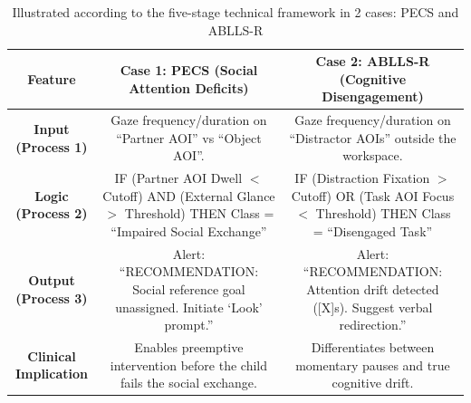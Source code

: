 \begin{table}
    \caption{Illustrated according to the five-stage technical framework in 2 cases: PECS and ABLLS-R}
    \label{tb12}
    \renewcommand{\arraystretch}{3}
    \centering
    \small
    \begin{tabular}{|c|c|c|}
        \hline
        {\parbox{2cm}{\centering\textbf{Feature}}} 
        & {\parbox{5cm}{\textbf{Case 1: PECS (Social Attention Deficits)}}}
        & {\parbox{5cm}{\textbf{Case 2: ABLLS-R (Cognitive Disengagement)}}}
        \\ \hline

        {\parbox{2cm}{\textbf{Input (Process 1)}}}
        & {\parbox{5cm}{Gaze frequency/duration on “Partner AOI” vs “Object AOI”.}}
        & {\parbox{5cm}{Gaze frequency/duration on “Distractor AOIs” outside the workspace.}}
        \\ \hline

        {\parbox{2cm}{\textbf{Logic (Process 2)}}} 
        & {\parbox{5cm}{IF (Partner AOI Dwell $<$ Cutoff) AND (External Glance $>$ Threshold) THEN Class = “Impaired Social Exchange”}}
        & {\parbox{5cm}{IF (Distraction Fixation $>$ Cutoff) OR (Task AOI Focus $<$ Threshold) THEN Class = “Disengaged Task”}}
        \\ \hline

        {\parbox{2cm}{\textbf{Output (Process 3)}}} 
        & {\parbox{5cm}{Alert: “RECOMMENDATION: Social reference goal unassigned. Initiate ‘Look’ prompt.”}}
        & {\parbox{5cm}{Alert: “RECOMMENDATION: Attention drift detected ([X]s). Suggest verbal redirection.”}}
        \\ \hline

        {\parbox{2cm}{\textbf{Clinical Implication}}}
        & {\parbox{5cm}{Enables preemptive intervention before the child fails the social exchange.}}
        & {\parbox{5cm}{Differentiates between momentary pauses and true cognitive drift.}}
        \\ \hline
    \end{tabular}
    \label{tbadd1}
\end{table}
